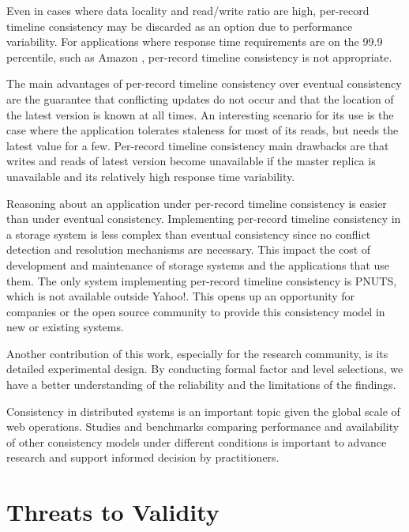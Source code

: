 \documentclass[doublespacing]{bmcart}
\begin{document}
Even in cases where data locality and read/write ratio are high, per-record
timeline consistency may be discarded as an option due to performance
variability. For applications where response time requirements are on the 99.9
percentile, such as Amazon \cite{DeCandia2007}, per-record timeline consistency
is not appropriate.

The main advantages of per-record timeline consistency over eventual
consistency are the guarantee that conflicting updates do not occur and that
the location of the latest version is known at all times. An interesting
scenario for its use is the case where the application tolerates staleness for
most of its reads, but needs the latest value for a few. Per-record
timeline consistency main drawbacks are that writes and reads of latest version
become unavailable if the master replica is unavailable and its relatively high
response time variability.

Reasoning about an application under per-record timeline consistency is easier
than under eventual consistency. Implementing per-record timeline consistency
in a storage system is less complex than eventual consistency since no conflict
detection and resolution mechanisms are necessary. This impact the cost of
development and maintenance of storage systems and the applications that use
them. The only system implementing per-record timeline consistency is PNUTS,
which is not available outside Yahoo!. This opens up an opportunity for
companies or the open source community to provide this consistency model in new
or existing systems.

Another contribution of this work, especially for the research community, is its
detailed experimental design. By conducting formal factor and level selections,
we have a better understanding of the reliability and the limitations of the
findings.

Consistency in distributed systems is an important topic given the global scale
of web operations. Studies and benchmarks comparing performance and
availability of other consistency models under different conditions is
important to advance research and support informed decision by practitioners.

\label{threats_to_validity}
\section{Threats to Validity}
\end{document}
